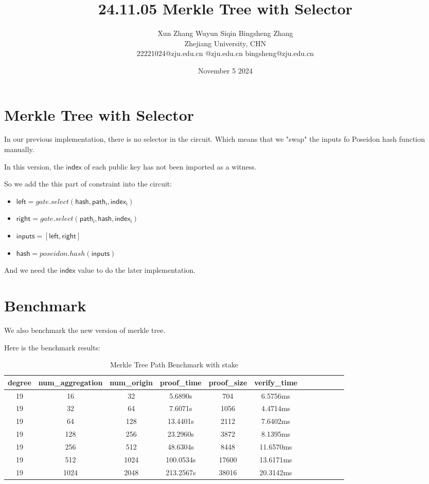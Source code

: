 \documentclass{article}
\title{24.11.05 Merkle Tree with Selector}
\author{Xun Zhang \quad \quad Wuyun Siqin \quad \quad Bingsheng Zhang \\ 
Zhejiang University, CHN \\
22221024@zju.edu.cn \quad 3210101763@zju.edu.cn \quad bingsheng@zju.edu.cn}
\date{November 5 2024}
\begin{document}
\maketitle

\section{Merkle Tree with Selector}

In our previous implementation, there is no selector in the circuit. Which means that we "swap" the inputs fo Poseidon hash function manually.

In this version, the $\mathsf{index}$ of each public key has not been imported as a witness.

So we add the this part of constraint into the circuit:

\begin{itemize}
    \item $\mathsf{left} = gate.select(\mathsf{hash, path_i, index_i})$
    \item $\mathsf{right} = gate.select(\mathsf{path_i, hash, index_i})$
    \item $\mathsf{inputs = [left, right]}$
    \item $\mathsf{hash} = poseidon.hash(\mathsf{inputs})$
\end{itemize}

And we need the $\mathsf{index}$ value to do the later implementation.


\section{Benchmark}

We also benchmark the new version of merkle tree.

Here is the benchmark results:
\begin{table}[h!]
\centering
\begin{tabular}{|c|c|c|c|c|c|c|c|c|c|c|c|}
\hline
\textbf{degree}    & \textbf{num\_aggregation} & \textbf{num\_origin} & \textbf{proof\_time} & \textbf{proof\_size} & \textbf{verify\_time} \\ \hline
19   & 16 & 32 & 5.6890s & 704 & 6.5756ms \\ \hline
19   & 32 & 64 & 7.6071s & 1056 & 4.4714ms \\ \hline
19    & 64 & 128 & 13.4401s & 2112 & 7.6402ms \\ \hline
19   & 128 & 256 & 23.2960s & 3872 & 8.1395ms \\ \hline
19   & 256 & 512 & 48.6304s & 8448 & 11.6570ms \\ \hline
19    & 512 & 1024 & 100.0534s & 17600 & 13.6171ms \\ \hline
19    & 1024 & 2048 & 213.2567s & 38016 & 20.3142ms \\ \hline
\end{tabular}
\caption{Merkle Tree Path Benchmark with stake}
\label{tab:data_table}
\end{table}
\end{document}
